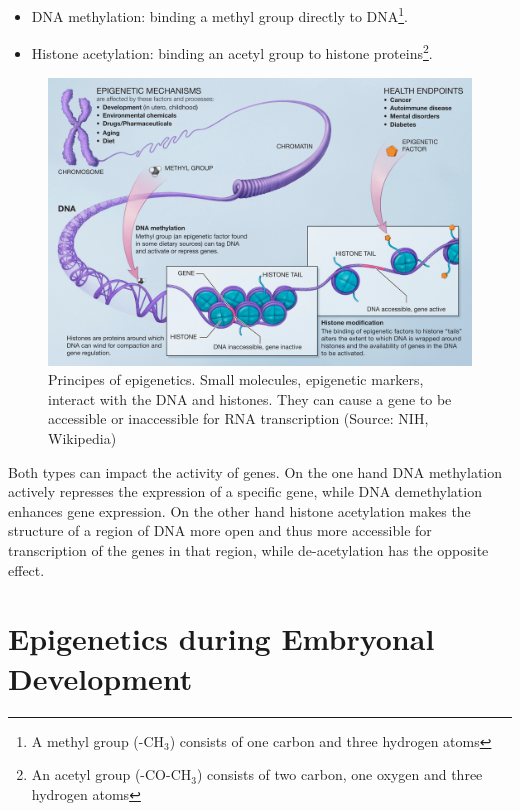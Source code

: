 \documentclass[
  11pt,
]{book}
\providecommand{\tightlist}{%
  \setlength{\itemsep}{0pt}\setlength{\parskip}{0pt}}
\begin{document}
\begin{itemize}
\tightlist
\item
  DNA methylation: binding a methyl group directly to DNA\footnote{A methyl group (-CH\(_3\)) consists of one carbon and three hydrogen atoms}.
\item
  Histone acetylation: binding an acetyl group to histone proteins\footnote{An acetyl group (-CO-CH\(_3\)) consists of two carbon, one oxygen and three hydrogen atoms}.
\end{itemize}

\begin{figure}

{\centering \includegraphics[width=1\linewidth]{./figs/Epigenetic_mechanisms} 

}

\caption{Principes of epigenetics. Small molecules, epigenetic markers, interact with the DNA and histones. They can cause a gene to be accessible or inaccessible for RNA transcription (Source: NIH, Wikipedia)}\label{fig:epigenetics}
\end{figure}

Both types can impact the activity of genes.
On the one hand DNA methylation actively represses the expression of a specific gene, while DNA demethylation enhances gene expression.
On the other hand histone acetylation makes the structure of a region of DNA more open and thus more accessible for transcription of the genes in that region, while de-acetylation has the opposite effect.

\hypertarget{epigenetics-during-embryonal-development}{%
\section{Epigenetics during Embryonal Development}\label{epigenetics-during-embryonal-development}}
\end{document}
